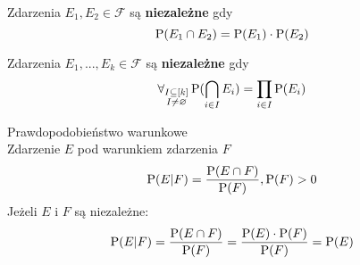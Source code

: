 \begin{definition} Zdarzenia \(E_1, E_2 \in \mathcal{F}\) są \textbf{niezależne} gdy
	\[
		\operatorname{P}(E_1 \cap E_2) = \operatorname{P}(E_1) \cdot \operatorname{P}(E_2)
	\]
\end{definition}

\begin{definition} Zdarzenia \(E_1, ..., E_k \in \mathcal{F}\) są \textbf{niezależne} gdy
	\[
		\forall_{\substack{I \subseteq [k] \\ I \ne \varnothing}} \operatorname{P}(\bigcap_{i \in I} E_i) = \prod_{i \in I} \operatorname{P}(E_i)
	\]
\end{definition}

\begin{definition} Prawdopodobieństwo warunkowe \\
	Zdarzenie \(E\) pod warunkiem zdarzenia \(F\)
	\[
		\operatorname{P}(E|F) = \frac{\operatorname{P}(E \cap F)}{\operatorname{P}(F)}, \operatorname{P}(F) > 0
	\]
	Jeżeli \(E\) i \(F\) są niezależne:
	\[
		\operatorname{P}(E|F) = \frac{\operatorname{P}(E \cap F)}{\operatorname{P}(F)} = \frac{\operatorname{P}(E)\cdot \operatorname{P}(F)}{\operatorname{P}(F)} = \operatorname{P}(E)
	\]
\end{definition}
